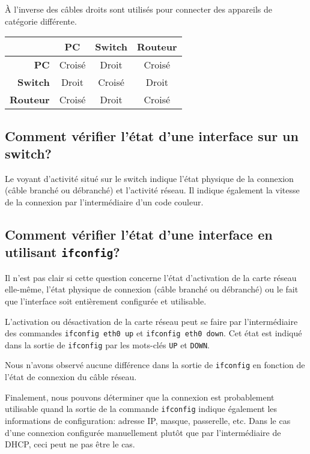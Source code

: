\documentclass[11pt,a4paper]{article}
\begin{document}
À l'inverse des câbles droits sont utilisés pour connecter des appareils de catégorie différente.

\begin{center}
\begin{tabular}{r|ccc}
	& \textbf{PC} & \textbf{Switch} & \textbf{Routeur} \\
	\hline
	\textbf{PC}      & Croisé & Droit  & Croisé \\
	\textbf{Switch}  & Droit  & Croisé & Droit  \\
	\textbf{Routeur} & Croisé & Droit  & Croisé \\
\end{tabular}
\end{center}

\subsection{Comment vérifier l'état d'une interface sur un switch?}

Le voyant d'activité situé sur le switch indique l'état physique de la connexion (câble branché ou débranché) et l'activité réseau. Il indique également la vitesse de la connexion par l'intermédiaire d'un code couleur.


\subsection{Comment vérifier l'état d'une interface en utilisant \texttt{ifconfig}?}

Il n'est pas clair si cette question concerne l'état d'activation de la carte réseau elle-même, l'état physique de connexion (câble branché ou débranché) ou le fait que l'interface soit entièrement configurée et utilisable.

L'activation ou désactivation de la carte réseau peut se faire par l'intermédiaire des commandes \texttt{ifconfig eth0 up} et \texttt{ifconfig eth0 down}. Cet état est indiqué dans la sortie de \texttt{ifconfig} par les mots-clés \texttt{UP} et \texttt{DOWN}.

Nous n'avons observé aucune différence dans la sortie de \texttt{ifconfig} en fonction de l'état de connexion du câble réseau.

Finalement, nous pouvons déterminer que la connexion est probablement utilisable quand la sortie de la commande \texttt{ifconfig} indique également les informations de configuration: adresse IP, masque, passerelle, etc. Dans le cas d'une connexion configurée manuellement plutôt que par l'intermédiaire de DHCP, ceci peut ne pas être le cas.
\end{document}
